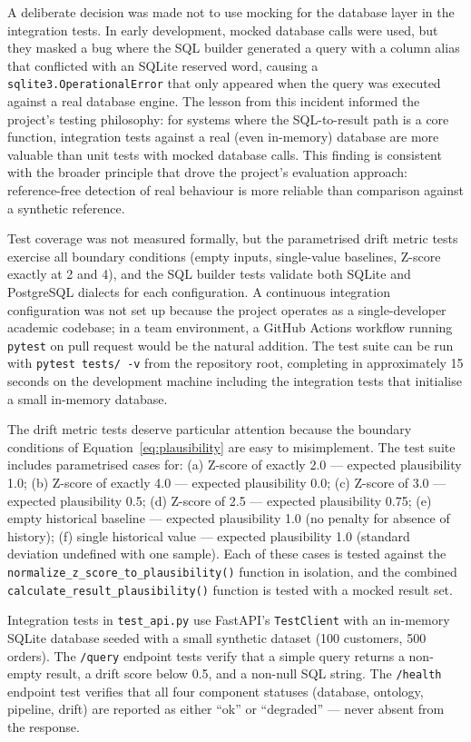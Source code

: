 \documentclass[12pt,a4paper]{report}
\begin{document}
A deliberate decision was made not to use mocking for the database layer in the integration tests. In early development, mocked database calls were used, but they masked a bug where the SQL builder generated a query with a column alias that conflicted with an SQLite reserved word, causing a \texttt{sqlite3.OperationalError} that only appeared when the query was executed against a real database engine. The lesson from this incident informed the project's testing philosophy: for systems where the SQL-to-result path is a core function, integration tests against a real (even in-memory) database are more valuable than unit tests with mocked database calls. This finding is consistent with the broader principle that drove the project's evaluation approach: reference-free detection of real behaviour is more reliable than comparison against a synthetic reference.

Test coverage was not measured formally, but the parametrised drift metric tests exercise all boundary conditions (empty inputs, single-value baselines, Z-score exactly at 2 and 4), and the \ac{SQL} builder tests validate both SQLite and PostgreSQL dialects for each configuration. A continuous integration configuration was not set up because the project operates as a single-developer academic codebase; in a team environment, a GitHub Actions workflow running \texttt{pytest} on pull request would be the natural addition. The test suite can be run with \texttt{pytest tests/ -v} from the repository root, completing in approximately 15 seconds on the development machine including the integration tests that initialise a small in-memory database.

The drift metric tests deserve particular attention because the boundary conditions of Equation~\ref{eq:plausibility} are easy to misimplement. The test suite includes parametrised cases for: (a) Z-score of exactly 2.0 — expected plausibility 1.0; (b) Z-score of exactly 4.0 — expected plausibility 0.0; (c) Z-score of 3.0 — expected plausibility 0.5; (d) Z-score of 2.5 — expected plausibility 0.75; (e) empty historical baseline — expected plausibility 1.0 (no penalty for absence of history); (f) single historical value — expected plausibility 1.0 (standard deviation undefined with one sample). Each of these cases is tested against the \texttt{normalize\_z\_score\_to\_plausibility()} function in isolation, and the combined \texttt{calculate\_result\_plausibility()} function is tested with a mocked result set.

Integration tests in \texttt{test\_api.py} use FastAPI's \texttt{TestClient} with an in-memory SQLite database seeded with a small synthetic dataset (100 customers, 500 orders). The \texttt{/query} endpoint tests verify that a simple query returns a non-empty result, a drift score below 0.5, and a non-null \ac{SQL} string. The \texttt{/health} endpoint test verifies that all four component statuses (database, ontology, pipeline, drift) are reported as either ``ok'' or ``degraded'' — never absent from the response.
\end{document}
